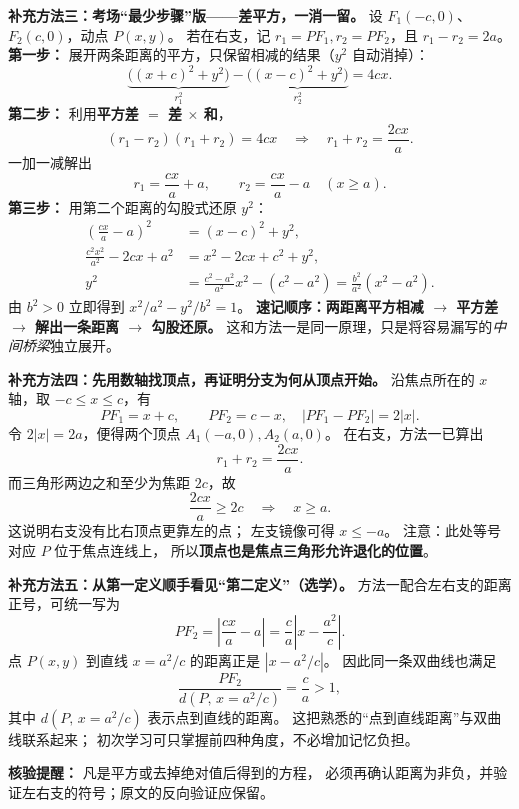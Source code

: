 \begin{proofbox}
\textbf{补充方法三：考场“最少步骤”版——差平方，一消一留。}
设 $F_1(-c,0)$、$F_2(c,0)$，动点 $P(x,y)$。
若在右支，记 $r_1=PF_1,r_2=PF_2$，且 $r_1-r_2=2a$。
\textbf{第一步：} 展开两条距离的平方，只保留相减的结果（$y^2$ 自动消掉）：
\[
\underbrace{\bigl((x+c)^2+y^2\bigr)}_{r_1^2}
-\underbrace{\bigl((x-c)^2+y^2\bigr)}_{r_2^2}=4cx.
\]
\textbf{第二步：} 利用\textbf{平方差 $=$ 差 $\times$ 和}，
\[
(r_1-r_2)(r_1+r_2)=4cx
\quad\Longrightarrow\quad r_1+r_2=\frac{2cx}{a}.
\]
一加一减解出
\[
\boxed{r_1=\frac{cx}{a}+a,\qquad r_2=\frac{cx}{a}-a}\quad(x\ge a).
\]
\textbf{第三步：} 用第二个距离的勾股式还原 $y^2$：
\[
\begin{aligned}
\left(\frac{cx}{a}-a\right)^2&=(x-c)^2+y^2,\\
\frac{c^2x^2}{a^2}-2cx+a^2
 &=x^2-2cx+c^2+y^2,\\
y^2&=\frac{c^2-a^2}{a^2}x^2-(c^2-a^2)
   =\frac{b^2}{a^2}(x^2-a^2).
\end{aligned}
\]
由 $b^2>0$ 立即得到 $x^2/a^2-y^2/b^2=1$。
\textbf{速记顺序：两距离平方相减 $\to$ 平方差 $\to$ 解出一条距离 $\to$ 勾股还原。}
这和方法一是同一原理，只是将容易漏写的\emph{中间桥梁}独立展开。
\end{proofbox}
\clearpage
\begin{proofbox}
\textbf{补充方法四：先用数轴找顶点，再证明分支为何从顶点开始。}
沿焦点所在的 $x$ 轴，取 $-c\le x\le c$，有
\[
PF_1=x+c,\qquad PF_2=c-x,
\quad |PF_1-PF_2|=2|x|.
\]
令 $2|x|=2a$，便得两个顶点 $A_1(-a,0),A_2(a,0)$。
在右支，方法一已算出
\[
r_1+r_2=\frac{2cx}{a}.
\]
而三角形两边之和至少为焦距 $2c$，故
\[
\frac{2cx}{a}\ge 2c
\quad\Longrightarrow\quad x\ge a.
\]
这说明右支没有比右顶点更靠左的点；
左支镜像可得 $x\le-a$。
注意：此处等号对应 $P$ 位于焦点连线上，
所以\textbf{顶点也是焦点三角形允许退化的位置}。

\textbf{补充方法五：从第一定义顺手看见“第二定义”（选学）。}
方法一配合左右支的距离正号，可统一写为
\[
PF_2=\left|\frac{cx}{a}-a\right|
=\frac ca\left|x-\frac{a^2}{c}\right|.
\]
点 $P(x,y)$ 到直线 $x=a^2/c$ 的距离正是 $|x-a^2/c|$。
因此同一条双曲线也满足
\[
\boxed{\frac{PF_2}{d(P,\,x=a^2/c)}=\frac ca>1},
\]
其中 $d(P,\,x=a^2/c)$ 表示点到直线的距离。
这把熟悉的“点到直线距离”与双曲线联系起来；
初次学习可只掌握前四种角度，不必增加记忆负担。

\textbf{核验提醒：} 凡是平方或去掉绝对值后得到的方程，
必须再确认距离为非负，并验证左右支的符号；原文的反向验证应保留。
\end{proofbox}
\clearpage
